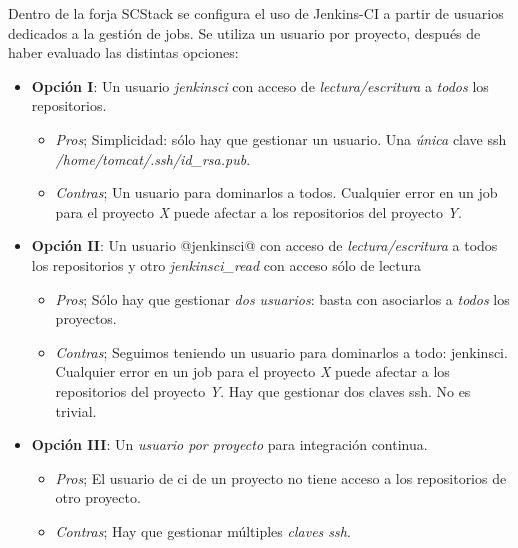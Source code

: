 \par Dentro de la forja SCStack se configura el uso de Jenkins-CI a partir de usuarios dedicados a la gestión de jobs. Se utiliza un usuario por proyecto, después de haber evaluado las distintas opciones:

\begin{itemize}
	\item \textbf{Opción I}: Un usuario \emph{jenkinsci} con acceso de \emph{lectura/escritura} a \emph{todos} los repositorios.
        \begin{itemize}

        	\item \emph{Pros}; Simplicidad: sólo hay que gestionar un usuario. Una \emph{única} clave ssh \emph{/home/tomcat/.ssh/id\_rsa.pub}.
        	\item \emph{Contras}; Un usuario para dominarlos a todos. Cualquier error en un job para el proyecto \emph{X} puede afectar a los repositorios del proyecto \emph{Y}.
        \end{itemize}

	\item \textbf{Opción II}: Un usuario @jenkinsci@ con acceso de \emph{lectura/escritura} a todos los repositorios y  otro \emph{jenkinsci\_read} con acceso sólo de lectura	
        \begin{itemize}
        	\item \emph{Pros}; Sólo hay que gestionar \emph{dos usuarios}: basta con asociarlos a \emph{todos} los proyectos.
        	\item \emph{Contras}; Seguimos teniendo un usuario para dominarlos a todo: jenkinsci. Cualquier error en un job para el proyecto \emph{X} puede afectar a los repositorios del proyecto \emph{Y}. Hay que gestionar dos claves ssh. No es trivial.
        \end{itemize}

	\item \textbf{Opción III}: Un \emph{usuario por proyecto} para integración continua.
        \begin{itemize}
        	\item \emph{Pros}; El usuario de ci de un proyecto no tiene acceso a los repositorios de otro proyecto.
        	\item \emph{Contras}; Hay que gestionar múltiples \emph{claves ssh}.
        \end{itemize}

\end{itemize}

